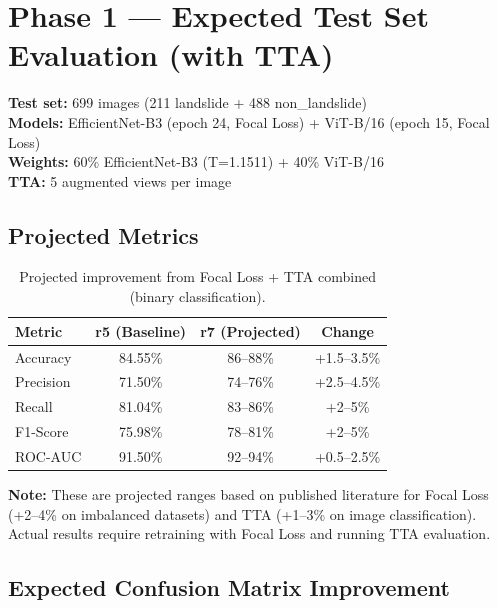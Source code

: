 \documentclass[11pt]{article}
\begin{document}
\section{Phase 1 --- Expected Test Set Evaluation (with TTA)}

\noindent \textbf{Test set:} 699 images (211 landslide + 488 non\_landslide) \\
\textbf{Models:} EfficientNet-B3 (epoch 24, Focal Loss) + ViT-B/16 (epoch 15, Focal Loss) \\
\textbf{Weights:} 60\% EfficientNet-B3 (T=1.1511) + 40\% ViT-B/16 \\
\textbf{TTA:} 5 augmented views per image

\subsection{Projected Metrics}

\begin{table}[H]
    \centering
    \renewcommand{\arraystretch}{1.2}
    \begin{tabular}{lccc}
        \toprule
        \textbf{Metric} & \textbf{r5 (Baseline)} & \textbf{r7 (Projected)} & \textbf{Change} \\
        \midrule
        Accuracy  & 84.55\% & 86--88\% & +1.5--3.5\% \\
        Precision & 71.50\% & 74--76\% & +2.5--4.5\% \\
        Recall    & 81.04\% & 83--86\% & +2--5\% \\
        F1-Score  & 75.98\% & 78--81\% & +2--5\% \\
        ROC-AUC   & 91.50\% & 92--94\% & +0.5--2.5\% \\
        \bottomrule
    \end{tabular}
    \caption{Projected improvement from Focal Loss + TTA combined (binary classification).}
\end{table}

\noindent\textbf{Note:} These are projected ranges based on published literature for Focal Loss (+2--4\% on imbalanced datasets) and TTA (+1--3\% on image classification). Actual results require retraining with Focal Loss and running TTA evaluation.

\subsection{Expected Confusion Matrix Improvement}
\end{document}
